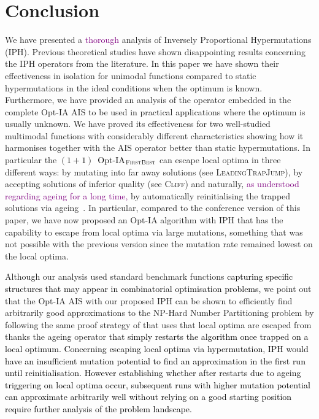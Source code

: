 \documentclass[lettersize,journal]{IEEEtran}
\newcommand{\rerev}[1]{\textcolor{purple}{#1}}
\newcommand{\rev}[1]{\textcolor{black}{#1}}
\begin{document}
\section{Conclusion}
We have presented a \rerev{thorough} analysis of Inversely Proportional Hypermutations (IPH).
Previous theoretical studies have shown disappointing results concerning the IPH operators from the literature.
In this paper we have 
shown their effectiveness in isolation for unimodal functions compared to static hypermutations in the ideal conditions when the optimum is known.
Furthermore, we have provided an analysis of the operator embedded in the complete Opt-IA AIS to be used in practical applications where the optimum is usually unknown.
We have proved its effectiveness for two well-studied multimodal functions with considerably different characteristics showing how it harmonises together with the AIS operator better than static hypermutations.
In particular the \rev{$(1+1)$~Opt-IA$_{\textsc{FirstBest}}$} can escape local optima in three different ways: by mutating into far away solutions (see \textsc{LeadingTrapJump}), by accepting solutions of inferior quality (see \textsc{Cliff}) and naturally, \rerev{as understood regarding ageing for a long time,}  by automatically reinitialising the trapped solutions via ageing~\cite{HorobaJansenZarges09,JansenZarges2011differentageing,JansenZarges2010restart,OlivetoSudholt2014ageing}.
In particular, compared to the conference version of this paper, we have now proposed an Opt-IA algorithm with IPH that has the capability to escape from local optima via large mutations, something that was not possible with the previous version since the mutation rate remained lowest on the local optima.


Although our analysis used standard benchmark functions \rev{capturing specific structures that may appear in combinatorial optimisation problems,}
 we point out that the Opt-IA AIS with our proposed IPH can be shown to efficiently find arbitrarily good approximations to the NP-Hard Number Partitioning problem by following the same proof strategy of \cite{CorusOlivetoYazdaniAIJ2019} that uses that local optima are escaped from thanks the ageing operator \rev{that simply restarts the algorithm once trapped on a local optimum.}  \textcolor{black}{Concerning escaping local optima via hypermutation, IPH would have an insufficient mutation potential to find an approximation in the first run until reinitialisation. However \rev{establishing} whether \rev{after restarts due to ageing triggering on local optima occur,} subsequent runs  with higher mutation potential can approximate arbitrarily well without relying on a good starting position require further analysis of the problem landscape.} 
\end{document}
